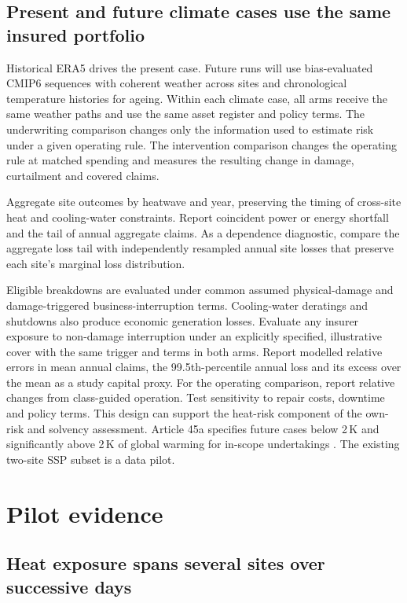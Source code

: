 \documentclass[11pt,a4paper]{article}
\begin{document}
\subsection*{Present and future climate cases use the same insured portfolio}

Historical ERA5 drives the present case. Future runs will use bias-evaluated CMIP6 sequences with coherent weather across sites and chronological temperature histories for ageing. Within each climate case, all arms receive the same weather paths and use the same asset register and policy terms. The underwriting comparison changes only the information used to estimate risk under a given operating rule. The intervention comparison changes the operating rule at matched spending and measures the resulting change in damage, curtailment and covered claims.

Aggregate site outcomes by heatwave and year, preserving the timing of cross-site heat and cooling-water constraints. Report coincident power or energy shortfall and the tail of annual aggregate claims. As a dependence diagnostic, compare the aggregate loss tail with independently resampled annual site losses that preserve each site's marginal loss distribution.

Eligible breakdowns are evaluated under common assumed physical-damage and damage-triggered business-interruption terms. Cooling-water deratings and shutdowns also produce economic generation losses. Evaluate any insurer exposure to non-damage interruption under an explicitly specified, illustrative cover with the same trigger and terms in both arms. Report modelled relative errors in mean annual claims, the 99.5th-percentile annual loss and its excess over the mean as a study capital proxy. For the operating comparison, report relative changes from class-guided operation. Test sensitivity to repair costs, downtime and policy terms. This design can support the heat-risk component of the own-risk and solvency assessment. Article 45a specifies future cases below 2\,K and significantly above 2\,K of global warming for in-scope undertakings \cite{solvency}. The existing two-site SSP subset is a data pilot.

\section*{Pilot evidence}

\subsection*{Heat exposure spans several sites over successive days}
\end{document}
